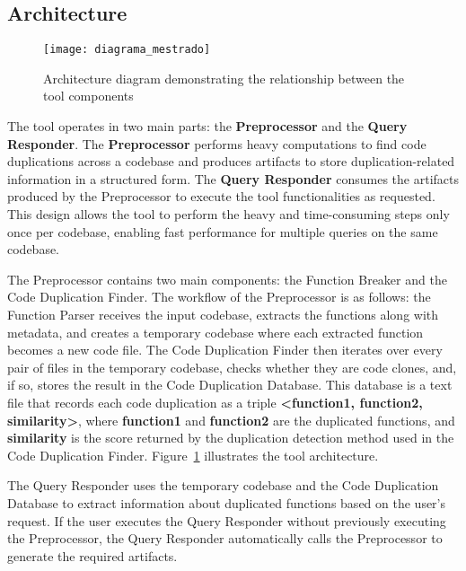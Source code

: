 \documentclass[conference]{IEEEtran}
\begin{document}
\subsection{Architecture}

\begin{figure}[!t]
\centering
\texttt{[image: diagrama\_mestrado]}
\caption{Architecture diagram demonstrating the relationship between the tool components}
\label{fig:diagram}
\end{figure}

The tool operates in two main parts: the \textbf{Preprocessor} and the \textbf{Query Responder}. 
The \textbf{Preprocessor} performs heavy computations to find code 
duplications across a codebase and produces artifacts to store duplication-related information 
in a structured form. The \textbf{Query Responder} consumes the artifacts produced 
by the Preprocessor to execute the tool functionalities as requested. This design allows the 
tool to perform the heavy and time-consuming steps only once per codebase, enabling fast performance 
for multiple queries on the same codebase.

The Preprocessor contains two main components: the Function Breaker and the Code Duplication Finder. 
The workflow of the Preprocessor is as follows: the Function Parser receives the input codebase,
extracts the functions along with metadata, and creates a temporary codebase where each extracted 
function becomes a new code file. The Code Duplication Finder then iterates over every pair of files 
in the temporary codebase, checks whether they are code clones, and, if so, stores the result in 
the Code Duplication Database. This database is a text file that records each code duplication as a triple 
\textbf{<function1, function2, similarity>}, where \textbf{function1} and \textbf{function2} are the 
duplicated functions, and \textbf{similarity} is the score returned by the duplication detection method 
used in the Code Duplication Finder. Figure~\ref{fig:diagram} illustrates the tool architecture.

The Query Responder uses the temporary codebase and the Code Duplication Database to extract 
information about duplicated functions based on the user's request. If the user executes the 
Query Responder without previously executing the Preprocessor, the Query Responder automatically 
calls the Preprocessor to generate the required artifacts.
\end{document}
